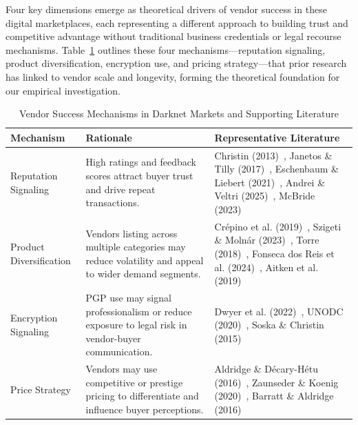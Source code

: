 \documentclass{article}
\begin{document}
Four key dimensions emerge as theoretical drivers of vendor success in these digital marketplaces, each representing a different approach to building trust and competitive advantage without traditional business credentials or legal recourse mechanisms. Table~\ref{tab:mechanisms} outlines these four mechanisms—reputation signaling, product diversification, encryption use, and pricing strategy—that prior research has linked to vendor scale and longevity, forming the theoretical foundation for our empirical investigation.

\begin{table}[ht]
\centering
\begin{tabular}{|p{3.5cm}|p{4.5cm}|p{4.5cm}|}
\hline
\textbf{Mechanism} & \textbf{Rationale} & \textbf{Representative Literature} \\
\hline
Reputation Signaling & High ratings and feedback scores attract buyer trust and drive repeat transactions. & Christin (2013)~\cite{christin2013}, Janetos \& Tilly (2017)~\cite{janetos2017}, Eschenbaum \& Liebert (2021)~\cite{eschenbaum2021}, Andrei \& Veltri (2025)~\cite{andrei2025}, McBride (2023)~\cite{yelp2023} \\
\hline
Product Diversification & Vendors listing across multiple categories may reduce volatility and appeal to wider demand segments. & Crépino et al. (2019)~\cite{crepino2019}, Szigeti \& Molnár (2023)~\cite{szigeti2023}, Torre (2018)~\cite{torre2018}, Fonseca dos Reis et al. (2024)~\cite{fonseca2024multihomers}, Aitken et al. (2019)~\cite{aitken2019} \\
\hline
Encryption Signaling & PGP use may signal professionalism or reduce exposure to legal risk in vendor-buyer communication. & Dwyer et al. (2022)~\cite{dwyer2022}, UNODC (2020)~\cite{unodc2020}, Soska \& Christin (2015)~\cite{soska2015} \\
\hline
Price Strategy & Vendors may use competitive or prestige pricing to differentiate and influence buyer perceptions. & Aldridge \& Décary-Hétu (2016)~\cite{aldridge2016}, Zaunseder \& Koenig (2020)~\cite{zaunseder2020}, Barratt \& Aldridge (2016)~\cite{barratt2016} \\
\hline
\end{tabular}
\caption{Vendor Success Mechanisms in Darknet Markets and Supporting Literature}
\label{tab:mechanisms}
\end{table}
\end{document}
